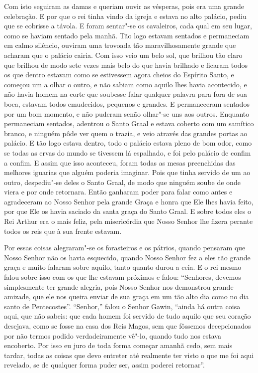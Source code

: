 Com isto seguiram as damas e queriam ouvir as vésperas, pois era uma grande
celebração. E por que o rei tinha vindo da igreja e estava no alto palácio,
pediu que se cobrisse a távola. E foram sentar"-se os cavaleiros, cada qual em
seu lugar, como se haviam sentado pela manhã. Tão logo estavam sentados e
permaneciam em calmo silêncio, ouviram uma trovoada tão maravilhosamente grande
que acharam que o palácio cairia. Com isso veio um belo sol, que brilhou tão
claro que brilhou de modo sete vezes mais belo do que havia brilhado e ficaram
todos os que dentro estavam como se estivessem agora cheios do Espírito Santo,
e começou um a olhar o outro, e não sabiam como aquilo lhes havia acontecido, e
não havia homem na corte que soubesse falar qualquer palavra para fora de sua
boca, estavam todos emudecidos, pequenos e grandes. E permaneceram sentados por
um bom momento, e não puderam senão olhar"-se uns aos outros. Enquanto
permaneciam sentados, adentrou o Santo Graal e estava coberto com um samítico
branco, e ninguém pôde ver quem o trazia, e veio através das grandes portas ao
palácio. E tão logo estava dentro, todo o palácio estava pleno de bom odor,
como se todas as ervas do mundo se tivessem lá espalhado, e foi pelo palácio de
confim a confim. E assim que isso aconteceu, foram todas as mesas preenchidas
das melhores iguarias que alguém poderia imaginar. Pois que tinha servido de um
ao outro, despediu"-se deles o Santo Graal, de modo que ninguém soube de onde
viera e por onde retornara. Então ganharam poder para falar como antes e
agradeceram ao Nosso Senhor pela grande Graça e honra que Ele lhes havia feito,
por que Ele os havia saciado da santa graça do Santo Graal. E sobre todos eles
o Rei Arthur era o mais feliz, pela misericórdia que Nosso Senhor lhe fizera
perante todos os reis que à sua frente estavam. 

Por essas coisas alegraram"-se os forasteiros e os pátrios, quando pensaram que
Nosso Senhor não os havia esquecido, quando Nosso Senhor fez a eles tão grande
graça e muito falaram sobre aquilo, tanto quanto durou a ceia. E o rei mesmo
falou sobre isso com os que lhe estavam próximos e falou: “Senhores, devemos
simplesmente ter grande alegria, pois Nosso Senhor nos demonstrou grande
amizade, que ele nos queira enviar de sua graça em um tão alto dia como no dia
santo de Pentecostes”. “Senhor,” falou o Senhor Gawin, “ainda há outra coisa
aqui, que não sabeis: que cada homem foi servido de tudo aquilo que seu coração
desejava, como se fosse na casa dos Reis Magos, sem que fôssemos decepcionados
por não termos podido verdadeiramente vê"-lo, quando tudo nos estava encoberto.
Por isso eu juro de toda forma começar amanhã cedo, sem mais tardar, todas as
coisas que devo entreter até realmente ter visto o que me foi aqui revelado, se
de qualquer forma puder ser, assim poderei retornar”. 


